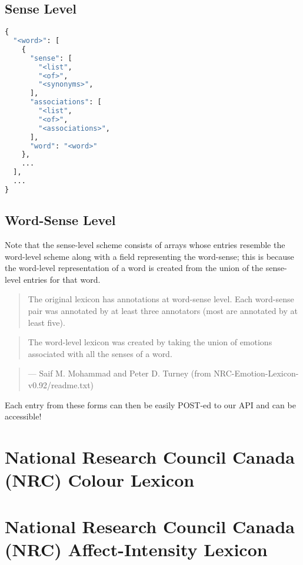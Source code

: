 \documentclass[11pt, twoside, reqno]{book}
\begin{document}
\subsection{Sense Level}
\begin{lstlisting}[language=Python]
{
  "<word>": [
    {
      "sense": [
        "<list",
        "<of>",
        "<synonyms>",
      ],
      "associations": [
        "<list",
        "<of>",
        "<associations>",
      ],
      "word": "<word>"
    },
    ...
  ],
  ...
}
\end{lstlisting}

\subsection{Word-Sense Level}

Note that the sense-level scheme consists of arrays whose entries resemble the word-level scheme along with a field representing the word-sense; this is because the word-level representation of a word is created from the union of the sense-level entries for that word.

\begin{quote}
The original lexicon has annotations at word-sense level. Each word-sense pair was annotated by at least three annotators (most are annotated by at least five).
\end{quote}

\begin{quote}
The word-level lexicon was created by taking the union of emotions associated with all the senses of a word.
\end{quote}

\begin{quote}
— Saif M. Mohammad and Peter D. Turney (from NRC-Emotion-Lexicon-v0.92/readme.txt)
\end{quote}

Each entry from these forms can then be easily POST-ed to our API and can be accessible!

\section{National Research Council Canada (NRC) Colour Lexicon}

\section{National Research Council Canada (NRC) Affect-Intensity Lexicon}
\end{document}
